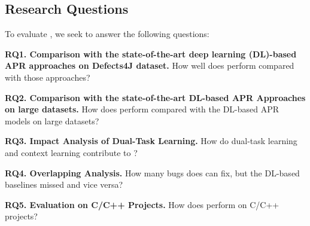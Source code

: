 \subsection{Research Questions}

To evaluate {\tool}, we seek to answer the following questions:

\noindent\textbf{RQ1. Comparison with the state-of-the-art deep learning
  (DL)-based APR approaches on Defects4J dataset.}  How well does
                {\tool} perform compared with those approaches?



\noindent\textbf{RQ2. Comparison with the state-of-the-art DL-based APR Approaches on large datasets.}  
How does {\tool} perform compared with the DL-based APR models on large datasets?




\noindent\textbf{RQ3. Impact Analysis of Dual-Task Learning.} How do
dual-task learning and context learning contribute to {\tool}?

\noindent\textbf{RQ4. Overlapping Analysis.} How many bugs does
                {\tool} can fix, but the DL-based baselines missed and
                vice versa?

\noindent\textbf{RQ5. Evaluation on C/C++ Projects.} How does {\tool} perform on C/C++ projects?

